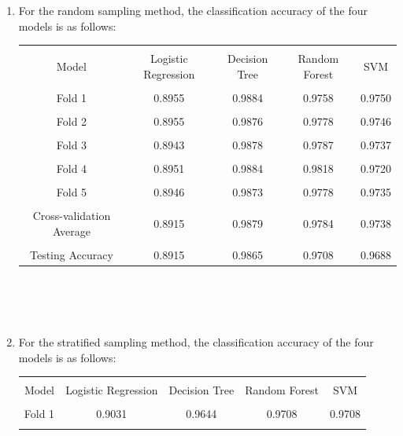 \documentclass[11pt]{article}
\begin{document}
\begin{enumerate}[-]
  \item For the random sampling method, the classification accuracy of the four models is as follows:
\\
\begin{table}[htbp]
\centering
	\begin{tabular}{|c|c|c|c|c|}  
		\hline  
		& & & &\\[-8pt]  
		Model&Logistic Regression&Decision Tree& Random Forest & SVM \\ 
		\hline
		& & & &\\[-8pt] 
		Fold 1 &0.8955 &0.9884 &0.9758 &0.9750 \\
		\hline
		& & & &\\[-8pt] 
		Fold 2& 0.8955 & 0.9876 &0.9778 &0.9746 \\
		\hline
		& & & &\\[-8pt] 
		Fold 3& 0.8943 &0.9878 &0.9787 &0.9737 \\
		\hline
		& & & &\\[-8pt] 
		Fold 4& 0.8951 &0.9884 &0.9818 &0.9720 \\
		\hline
		& & & &\\[-8pt] 
		Fold 5& 0.8946 &0.9873 &0.9778 &0.9735 \\
		\hline
		& & & &\\[-8pt] 
		Cross-validation Average&0.8915 &0.9879 &0.9784 &0.9738 \\
		\hline
		& & & &\\[-8pt] 
		Testing Accuracy&0.8915 &0.9865 &0.9708 &0.9688 \\
		\hline
	\end{tabular}
\end{table}
\\
\\
\\
\item For the stratified sampling method, the classification accuracy of the four models is as follows:
\\
\begin{table}[htbp]
\centering
	\begin{tabular}{|c|c|c|c|c|}  
		\hline  
		& & & &\\[-8pt]  
		Model&Logistic Regression&Decision Tree& Random Forest & SVM \\ 
		\hline
		& & & &\\[-8pt] 
		Fold 1 &0.9031 &0.9644 &0.9708 &0.9708  \\
		\hline
		& & & &\\[-8pt] 

\end{tabular}
\end{table}
\end{enumerate}
\end{document}
